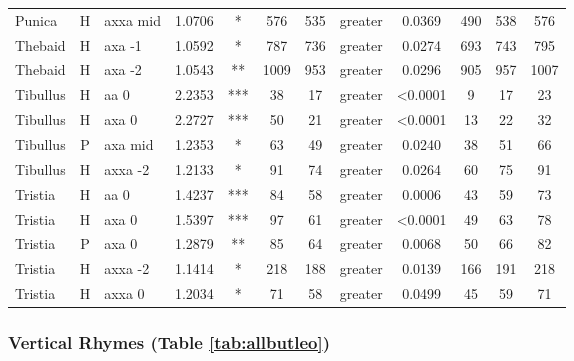 \documentclass[twocolumn, switch, a4paper]{article} %
\begin{document}
\begin{table}[h!]
\begin{adjustbox}{totalheight=0.9\textheight}
\begin{tabular}{lclcccclcc@{\hspace{1\tabcolsep}}c@{\hspace{1\tabcolsep}}c}
        Punica &     H &  axxa mid & 1.0706 &     * &   576 &       535 &     greater & 0.0369 &   490 &   538 &   576 \\
       Thebaid &     H &    axa -1 & 1.0592 &     * &   787 &       736 &     greater & 0.0274 &   693 &   743 &   795 \\
       Thebaid &     H &    axa -2 & 1.0543 &    ** &  1009 &       953 &     greater & 0.0296 &   905 &   957 &  1007 \\
      Tibullus &     H &      aa 0 & 2.2353 &   *** &    38 &        17 &     greater & <0.0001 &     9 &    17 &    23 \\
      Tibullus &     H &     axa 0 & 2.2727 &   *** &    50 &        21 &     greater & <0.0001 &    13 &    22 &    32 \\
      Tibullus &     P &   axa mid & 1.2353 &     * &    63 &        49 &     greater & 0.0240 &    38 &    51 &    66 \\
      Tibullus &     H &   axxa -2 & 1.2133 &     * &    91 &        74 &     greater & 0.0264 &    60 &    75 &    91 \\
       Tristia &     H &      aa 0 & 1.4237 &   *** &    84 &        58 &     greater & 0.0006 &    43 &    59 &    73 \\
       Tristia &     H &     axa 0 & 1.5397 &   *** &    97 &        61 &     greater & <0.0001 &    49 &    63 &    78 \\
       Tristia &     P &     axa 0 & 1.2879 &    ** &    85 &        64 &     greater & 0.0068 &    50 &    66 &    82 \\
       Tristia &     H &   axxa -2 & 1.1414 &     * &   218 &       188 &     greater & 0.0139 &   166 &   191 &   218 \\
       Tristia &     H &    axxa 0 & 1.2034 &     * &    71 &        58 &     greater & 0.0499 &    45 &    59 &    71 \\
  \bottomrule
  \end{tabular}
\end{adjustbox}
\end{table}

\subsubsection{Vertical Rhymes (Table \ref{tab:allbutleo})} 
\end{document}
